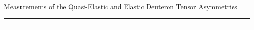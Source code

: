 \documentclass[12pt]{article}
\begin{document}
\pagestyle{empty}
 
\begin{center}
 \LARGE{
  Measurements of the Quasi-Elastic and Elastic Deuteron Tensor Asymmetries
 }
\end{center}
%
\hrule \vspace{.05cm}\hrule
%

\end{document}
